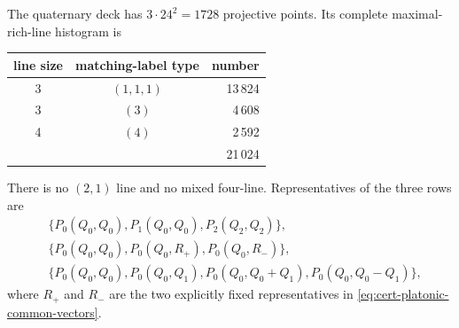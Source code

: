 \documentclass[11pt,letterpaper,onecolumn]{article}
\theoremstyle{plain}
\theoremstyle{definition}
\theoremstyle{remark}
\begin{document}
The quaternary deck has \(3\cdot24^2=1728\) projective points.  Its complete
maximal-rich-line histogram is
\begin{center}
\normalsize
\begin{tabular}{ccr}
\toprule
line size&matching-label type&number\\
\midrule
3&\((1,1,1)\)&13\,824\\
3&\((3)\)&4\,608\\
4&\((4)\)&2\,592\\
\midrule
&&21\,024\\
\bottomrule
\end{tabular}
\end{center}
There is no \((2,1)\) line and no mixed four-line.  Representatives of
the three rows are
\begin{align*}
&\{P_0(Q_0,Q_0),P_1(Q_0,Q_0),P_2(Q_2,Q_2)\},\\
&\{P_0(Q_0,Q_0),P_0(Q_0,R_+),P_0(Q_0,R_-)\},\\
&\{P_0(Q_0,Q_0),P_0(Q_0,Q_1),
       P_0(Q_0,Q_0+Q_1),P_0(Q_0,Q_0-Q_1)\},
\end{align*}
where \(R_+\) and \(R_-\) are the two explicitly fixed representatives in
\cref{eq:cert-platonic-common-vectors}.
\end{document}
